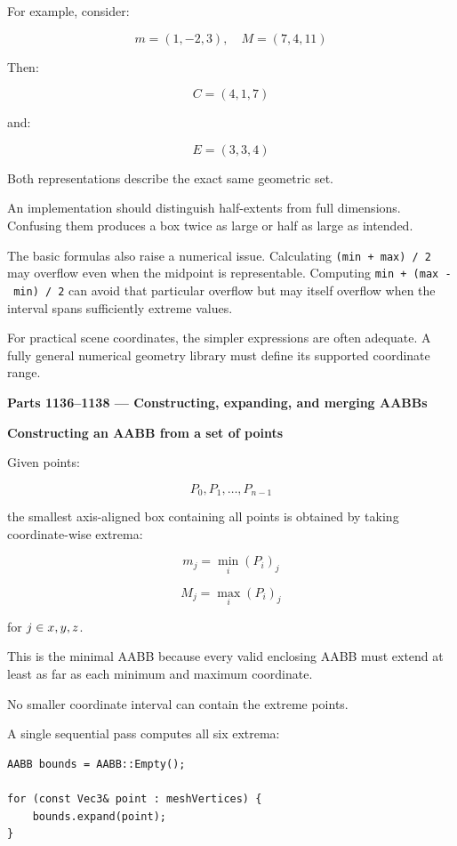 For example, consider:

\[
m=(1,-2,3),\quad M=(7,4,11)
\]

Then:

\[
C=(4,1,7)
\]

and:

\[
E=(3,3,4)
\]

Both representations describe the exact same geometric set.

An implementation should distinguish half-extents from full dimensions. Confusing them produces a box twice as large or half as large as intended.

The basic formulas also raise a numerical issue. Calculating \texttt{(min\ +\ max)\ /\ 2} may overflow even when the midpoint is representable. Computing \texttt{min\ +\ (max\ -\ min)\ /\ 2} can avoid that particular overflow but may itself overflow when the interval spans sufficiently extreme values.

For practical scene coordinates, the simpler expressions are often adequate. A fully general numerical geometry library must define its supported coordinate range.

\textbf{Parts 1136--1138 --- Constructing, expanding, and merging AABBs}

\textbf{Constructing an AABB from a set of points}

Given points:

\[
P_0,P_1,\ldots,P_{n-1}
\]

the smallest axis-aligned box containing all points is obtained by taking coordinate-wise extrema:

\[
\boxed{ m_j=\min_i(P_i)_j }
\]

\[
\boxed{ M_j=\max_i(P_i)_j }
\]

for \(j\in\\{x,y,z\\}\).

This is the minimal AABB because every valid enclosing AABB must extend at least as far as each minimum and maximum coordinate.

No smaller coordinate interval can contain the extreme points.

A single sequential pass computes all six extrema:

\begin{verbatim}
AABB bounds = AABB::Empty();

for (const Vec3& point : meshVertices) {
    bounds.expand(point);
}
\end{verbatim}

